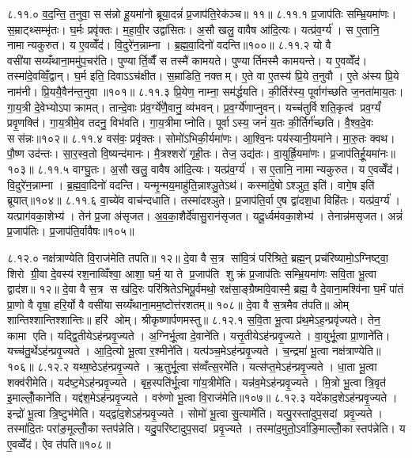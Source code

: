 ८.११.०
व॒द॒न्ति॒ त॒नुवा॒ सस॑न्नो हू॒यमा॑नो ब्रूया॒दन्नं॑ प्र॒जाप॑ति॒रेक॑ञ्च॥ ११॥
८.११.१
प्र॒जाप॑तिः सम्भ्रि॒यमा॑णः। स॒म्राट्थ्सम्भृ॑तः। घ॒र्मः प्रवृ॑क्तः। म॒हा॒वी॒र उद्वा॑सितः। अ॒सौ खलु॒ वावैष आ॑दि॒त्यः। यत्प्र॑व॒र्ग्य॑। स ए॒तानि॒ नामान्यकुरुत। य ए॒वव्वेँद॑। वि॒दुरे॑न॒न्नाम्ना। ब्र॒ह्म॒वा॒दिनो॑ वदन्ति॥१००॥
८.११.२
यो वै वसी॑यासय्यँथाना॒ममु॑प॒चर॑ति। पुण्यार्ति॒व्वैँ स तस्मै॑ कामयते। पुण्यार्तिमस्मै कामयन्ते। य ए॒वव्वेँद॑। तस्मा॑दे॒वव्विँ॒द्वान्। घ॒र्म इति॒ दिवाऽऽच॑क्षीत। स॒म्राडिति॒ नक्तम्। ए॒ते वा ए॒तस्य॑ प्रि॒ये त॒नुवौ। ए॒ते अ॑स्य प्रि॒ये नाम॑नी। प्रि॒ययै॒वैन॑न्त॒नुवा॥१०१॥
८.११.३
प्रि॒येण॒ नाम्ना॒ सम॑र्द्धयति। की॒र्तिर॑स्य॒ पूर्वाग॑च्छति ज॒नता॑माय॒तः। गा॒य॒त्री दे॒वेभ्योऽपाक्रामत्। तान्दे॒वाः प्र॑व॒र्ग्ये॑णै॒वानु॒ व्य॑भवन्। प्र॒व॒र्ग्ये॑णाप्नुवन्। यच्च॑तुर्विशति॒कृत्व॑ प्रव॒र्ग्यं॑ प्रवृ॒णक्ति॑। गा॒य॒त्रीमे॒व तदनु॒ विभ॑वति। गा॒य॒त्रीमाप्नोति। पूर्वाऽस्य॒ जनं॑ य॒तः की॒र्तिर्ग॑च्छति। वै॒श्व॒दे॒वः सस॑न्नः॥१०२॥
८.११.४
वस॑वः॒ प्रवृ॑क्तः। सोमो॑ऽभिकी॒र्यमा॑णः। आ॒श्वि॒नः पय॑स्यानी॒यमा॑ने। मा॒रु॒तः क्वथ\sn{}। पौ॒ष्ण उद॑न्तः। सा॒र॒स्व॒तो वि॒ष्यन्द॑मानः। मै॒त्रश्शरो॑ गृही॒तः। तेज॒ उद्य॑तः। वा॒युर्ह्रि॒यमा॑णः। प्र॒जाप॑तिर्\mbox{}हू॒यमा॑नः॥१०३॥
८.११.५
वाग्घु॒तः। अ॒सौ खलु॒ वावैष आ॑दि॒त्यः। यत्प्र॑व॒र्ग्य॑। स ए॒तानि॒ नामान्यकुरुत। य ए॒वव्वेँद॑। वि॒दुरे॑न॒न्नाम्ना। ब्र॒ह्म॒वा॒दिनो॑ वदन्ति। यन्मृ॒न्मय॒माहु॑ति॒न्नाश्ञु॒तेऽथ॑। कस्मा॑दे॒षोऽश्ञुत॒ इति॑। वागे॒ष इति॑ ब्रूयात्॥१०४॥
८.११.६
वा॒च्ये॑व वाच॑न्दधाति। तस्मा॑दश्ञुते। प्र॒जाप॑ति॒र्वा ए॒ष द्वा॑दश॒धा विहि॑तः। यत्प्र॑व॒र्ग्य॑। यत्प्राग॑वका॒शेभ्य॑। तेन॑ प्र॒जा अ॑सृजत। अ॒व॒का॒शैर्दे॑वासु॒रान॑सृजत। यदू॒र्ध्वम॑वका॒शेभ्य॑। तेनान्न॑मसृजत। अन्नं॑ प्र॒जाप॑तिः। प्र॒जाप॑ति॒र्वावैषः॥१०५॥
\anuvakamend

८.१२.०
नक्ष॑त्राण्येति वि॒राज॑मेति तपति॥ १२॥ दे॒वा वै स॒त्र सा॑वि॒त्रं परि॑श्रिते॒ ब्रह्म॒न् प्रच॑रिष्यामो॒ऽग्निष्ट्वा॒ शिरो ग्री॒वा दे॒वस्य॑ रश॒नाव्विँश्वा॒ आशा॒ घर्म॒ या ते प्र॒जाप॑ति शुक्रं प्र॒जाप॑तिः सम्भ्रि॒यमा॑णः सवि॒ता भू॒त्वा द्वाद॑श॥ १२॥ दे॒वा वै स॒त्र स ख॑दि॒रः परि॑श्रितेऽभिपू॒र्वमथो॒ रक्ष॑सा॒ङ्ग्रैष्मा॑वे॒वास्मै॒ ब्रह्म॒ वै दे॒वाना॒मश्वि॑ना घ॒र्मं पा॑तं प्रा॒णो वै वृषा॒ हरि॒र्यो वै वसी॑यासय्यँथाना॒मम॒ष्टोत्त॑रशतम्॥ १०८॥ दे॒वा वै स॒त्रमैव त॑पति॥ ओम् शान्तिश्शान्तिश्शान्तिः॥ हरि॑ ओम्। श्रीकृष्णार्पणमस्तु॥
८.१२.१
स॒वि॒ता भू॒त्वा प्र॑थ॒मेऽह॒न्प्रवृ॑ज्यते। तेन॒ कामा एति। यद्द्वि॒तीयेऽह॑न्प्रवृ॒ज्यते। अ॒ग्निर्भू॒त्वा दे॒वाने॑ति। यत्तृ॒तीयेऽह॑न्प्रवृ॒ज्यते। वा॒युर्भू॒त्वा प्रा॒णाने॑ति। यच्च॑तु॒र्थेऽह॑न्प्रवृ॒ज्यते। आ॒दि॒त्यो भू॒त्वा र॒श्मीने॑ति। यत्प॑ञ्च॒मेऽह॑न्प्रवृ॒ज्यते। च॒न्द्रमा॑ भू॒त्वा नक्ष॑त्राण्येति॥१०६॥
८.१२.२
यथ्ष॒ष्ठेऽह॑न्प्रवृ॒ज्यते। ऋ॒तुर्भू॒त्वा स॑व्वँत्स॒रमे॑ति। यत्स॑प्त॒मेऽह॑न्प्रवृ॒ज्यते। धा॒ता भू॒त्वा शक्व॑रीमेति। यद॑ष्ट॒मेऽह॑न्प्रवृ॒ज्यते। बृह॒स्पति॑र्भू॒त्वा गा॑य॒त्रीमे॑ति। यन्न॑व॒मेऽह॑न्प्रवृ॒ज्यते। मि॒त्रो भू॒त्वा त्रि॒वृत॑ इ॒माल्लोँ॒काने॑ति। यद्द॑श॒मेऽह॑न्प्रवृ॒ज्यते। वरु॑णो भू॒त्वा वि॒राज॑मेति॥१०७॥
८.१२.३
यदे॑काद॒शेऽह॑न्प्रवृ॒ज्यते। इन्द्रो॑ भू॒त्वा त्रि॒ष्टुभ॑मेति। यद्द्वा॑द॒शेऽह॑न्प्रवृ॒ज्यते। सोमो॑ भू॒त्वा सु॒त्यामे॑ति। यत्पु॒रस्ता॑दुप॒सदां प्रवृ॒ज्यते। तस्मा॑दि॒तः परा॑ङ॒मूल्लोँ॒कास्तप॑न्नेति। यदु॒परि॑ष्टादुप॒सदां प्रवृ॒ज्यते। तस्मा॑द॒मुतो॒ऽर्वाङि॒माल्लोँ॒कास्तप॑न्नेति। य ए॒वव्वेँद॑। ऐव त॑पति॥१०८॥

